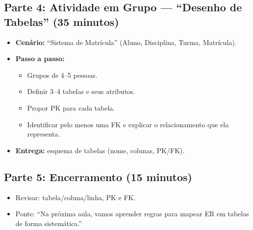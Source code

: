 \documentclass[12pt,a4paper]{article}
\begin{document}
\subsection*{Parte 4: Atividade em Grupo --- ``Desenho de Tabelas'' (35 minutos)}
\begin{itemize}[leftmargin=*,itemsep=0.35em]
  \item \textbf{Cenário:} ``Sistema de Matrícula'' (Aluno, Disciplina, Turma, Matrícula).
  \item \textbf{Passo a passo:}
  \begin{itemize}[leftmargin=*,itemsep=0.25em]
    \item Grupos de 4--5 pessoas.
    \item Definir 3--4 tabelas e seus atributos.
    \item Propor PK para cada tabela.
    \item Identificar pelo menos uma FK e explicar o relacionamento que ela representa.
  \end{itemize}
  \item \textbf{Entrega:} esquema de tabelas (nome, colunas, PK/FK).
\end{itemize}

\subsection*{Parte 5: Encerramento (15 minutos)}
\begin{itemize}[leftmargin=*,itemsep=0.35em]
  \item Revisar: tabela/coluna/linha, PK e FK.
  \item Ponte: ``Na próxima aula, vamos aprender regras para mapear ER em tabelas de forma sistemática.''
\end{itemize}
\end{document}
